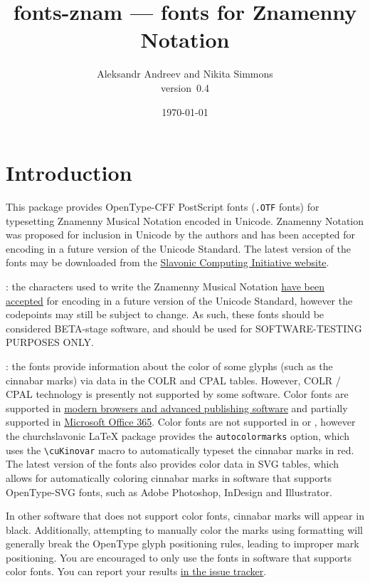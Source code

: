 \documentclass[11pt]{article}
\def\fileversion{0.4}
\def\pkg#1{\textsf{#1}}
\def\cs#1{\texttt{\textbackslash #1}}
\begin{document}
\title{\pkg{fonts-znam} --- fonts for Znamenny Notation}
\author{Aleksandr Andreev and Nikita Simmons\\version~\fileversion}
\date{\today}
\maketitle

\tableofcontents

\section{Introduction}
This package provides OpenType-CFF PostScript fonts (\texttt{.OTF} fonts)
for typesetting Znamenny Musical Notation encoded in Unicode. Znamenny
Notation was proposed for inclusion in Unicode by the authors and has
been accepted for encoding in a future version of the Unicode Standard.
The latest version of the fonts may be downloaded from the
\href{https://sci.ponomar.net/music.html}{Slavonic Computing Initiative website}.

: the characters used to write the Znamenny Musical Notation
\href{http://www.unicode.org/alloc/Pipeline.html}{have been accepted}
for encoding in a future version of the Unicode Standard,
however the codepoints may still be subject to change. As such,
these fonts should be considered BETA-stage software, and should be used
for SOFTWARE-TESTING PURPOSES ONLY.

: the fonts provide information about the color of some
glyphs (such as the cinnabar marks) via data in the COLR and CPAL tables.
However, COLR / CPAL technology is presently not supported by some software.
Color fonts are supported in \href{https://www.colorfonts.wtf/}{modern browsers
and advanced publishing software} and partially supported in
\href{https://office-watch.com/2019/color-font-support-in-microsoft-office-the-story-so-far/}{Microsoft
Office 365}. Color fonts are not supported in \XeTeX{} or \LuaTeX{}, however
the \pkg{churchslavonic} \LaTeX{} package provides the \texttt{autocolormarks} option,
which uses the \cs{cuKinovar} macro to automatically typeset the cinnabar marks in red.
The latest version of the fonts also provides color data in SVG tables,
which allows for automatically coloring cinnabar marks in software that
supports OpenType-SVG fonts, such as Adobe Photoshop, InDesign and Illustrator.

In other software that does not support color fonts, cinnabar marks will appear in black.
Additionally, attempting to manually color the marks using formatting will generally
break the OpenType glyph positioning rules, leading to improper mark positioning.
You are encouraged to only use the fonts in software that supports color fonts. You
can report your results \href{https://github.com/slavonic/fonts-znam/issues/19}{in
the issue tracker}.
\end{document}
